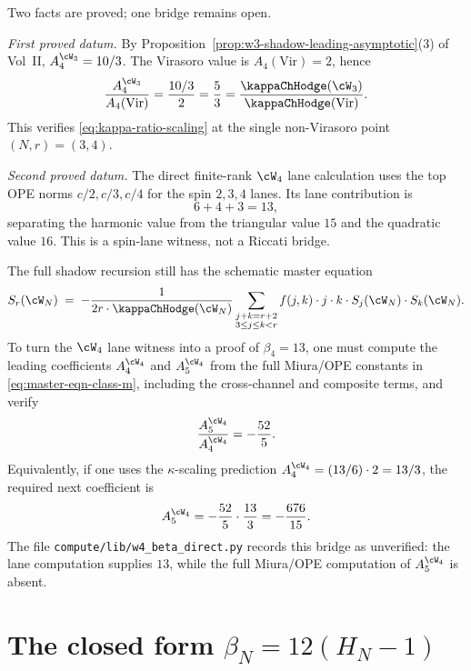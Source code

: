 \begin{remark}
Two facts are proved; one bridge remains open.

\emph{First proved datum.} By
Proposition~\ref{prop:w3-shadow-leading-asymptotic}(3) of Vol~II,
$A_4^{\cW_3} = 10/3$. The Virasoro value is
$A_4(\mathrm{Vir}) = 2$, hence
\[
 \frac{A_4^{\cW_3}}{A_4(\mathrm{Vir})}
 =
 \frac{10/3}{2}
 =
 \frac{5}{3}
 =
 \frac{\kappaChHodge(\cW_3)}{\kappaChHodge(\mathrm{Vir})}.
\]
This verifies \eqref{eq:kappa-ratio-scaling} at the single
non-Virasoro point $(N,r)=(3,4)$.

\emph{Second proved datum.} The direct finite-rank $\cW_4$ lane
calculation uses the top OPE norms \(c/2,c/3,c/4\) for the spin
\(2,3,4\) lanes. Its lane contribution is
\[
 6+4+3=13,
\]
separating the harmonic value from the triangular value \(15\) and the
quadratic value \(16\). This is a spin-lane witness, not a Riccati
bridge.

The full shadow recursion still has the schematic master equation
\begin{equation}
\label{eq:master-eqn-class-m}
S_r(\cW_N)
\;=\;
-\frac{1}{2 r \cdot \kappaChHodge(\cW_N)}
\sum_{\substack{j + k = r + 2 \\ 3 \le j \le k < r}}
 f(j, k) \cdot j \cdot k \cdot S_j(\cW_N) \cdot S_k(\cW_N).
\end{equation}
To turn the \(\cW_4\) lane witness into a proof of
\(\beta_4=13\), one must compute the leading coefficients
\(A_4^{\cW_4}\) and \(A_5^{\cW_4}\) from the full Miura/OPE constants in
\eqref{eq:master-eqn-class-m}, including the cross-channel and composite
terms, and verify
\begin{equation}
\label{eq:w4-missing-riccati-bridge}
 \frac{A_5^{\cW_4}}{A_4^{\cW_4}}
 =
 -\frac{52}{5}.
\end{equation}
Equivalently, if one uses the \(\kappa\)-scaling prediction
\(A_4^{\cW_4}= (13/6)\cdot 2=13/3\), the required next coefficient is
\[
 A_5^{\cW_4}
 =
 -\frac{52}{5}\cdot \frac{13}{3}
 =
 -\frac{676}{15}.
\]
The file \texttt{compute/lib/w4\_beta\_direct.py} records this bridge as
unverified: the lane computation supplies \(13\), while the full
Miura/OPE computation of \(A_5^{\cW_4}\) is absent.
\end{remark}

\section{The closed form $\beta_N = 12(H_N - 1)$}
\label{sec:beta-N-closed-form-theorem}

